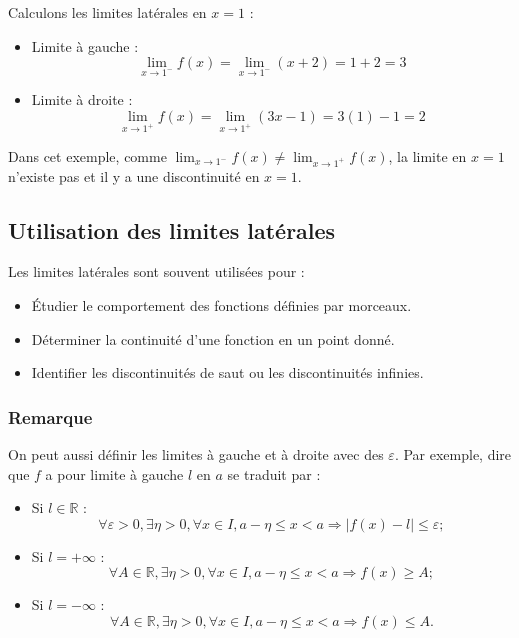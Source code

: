 \documentclass{article}
\begin{document}
Calculons les limites latérales en \( x = 1 \) :
\begin{itemize}
	\item Limite à gauche :
	\[
	\lim_{x \to 1^-} f(x) = \lim_{x \to 1^-} (x + 2) = 1 + 2 = 3
	\]
	\item Limite à droite :
	\[
	\lim_{x \to 1^+} f(x) = \lim_{x \to 1^+} (3x - 1) = 3(1) - 1 = 2
	\]
\end{itemize}

Dans cet exemple, comme \( \lim_{x \to 1^-} f(x) \neq \lim_{x \to 1^+} f(x) \), la limite en \( x = 1 \) n'existe pas et il y a une discontinuité en \( x = 1 \).

\subsection{Utilisation des limites latérales}

Les limites latérales sont souvent utilisées pour :
\begin{itemize}
	\item Étudier le comportement des fonctions définies par morceaux.
	\item Déterminer la continuité d'une fonction en un point donné.
	\item Identifier les discontinuités de saut ou les discontinuités infinies.
\end{itemize}


	

	
	\subsubsection{Remarque}
	
	On peut aussi définir les limites à gauche et à droite avec des $\varepsilon$. Par exemple, dire que $f$ a pour limite à gauche $l$ en $a$ se traduit par :
	
	\begin{itemize}
		\item Si $l \in \mathbb{R}$ : 
		\[
		\forall \varepsilon > 0, \exists \eta > 0, \forall x \in I, a - \eta \leq x < a \Rightarrow |f(x) - l| \leq \varepsilon;
		\]
		\item Si $l = +\infty$ :
		\[
		\forall A \in \mathbb{R}, \exists \eta > 0, \forall x \in I, a - \eta \leq x < a \Rightarrow f(x) \geq A;
		\]
		\item Si $l = -\infty$ :
		\[
		\forall A \in \mathbb{R}, \exists \eta > 0, \forall x \in I, a - \eta \leq x < a \Rightarrow f(x) \leq A.
		\]
	\end{itemize}
\end{document}
